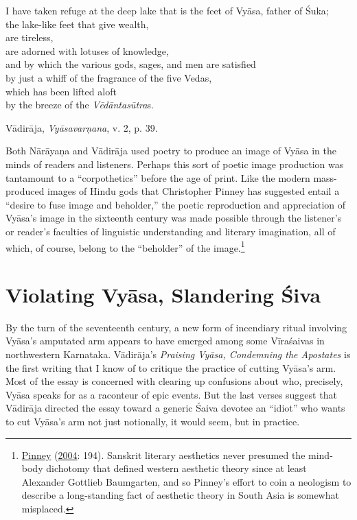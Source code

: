 \begin{pullquote}

            I have taken refuge at the deep lake that is the feet of Vyāsa, father of Śuka;\\
            the lake-like feet that give wealth,\\
            are tireless,\\
            are adorned with lotuses of knowledge,\\
            and by which the various gods, sages, and men are satisfied\\
            by just a whiff of the fragrance of the five Vedas,\\
            which has been lifted aloft\\
            by the breeze of the \emph{Vēdāntasūtra}s.
	  

\medskip\hfill\begin{minipage}{0.9\textwidth}\small\hfill
Vādirāja, \emph{{Vyāsavarṇana}}, v. 2, p. 39.\end{minipage}\hspace{2em}
\end{pullquote}

Both Nārāyaṇa and Vādirāja used poetry to produce an image of Vyāsa in the minds of readers and listeners. Perhaps this sort of poetic image production was tantamount to a “corpothetics” before the age of print. Like the modern mass-produced images of Hindu gods that Christopher Pinney has suggested entail a “desire to fuse image and beholder,” the poetic reproduction and appreciation of Vyāsa’s image in the sixteenth century was made possible through the listener’s or reader’s faculties of linguistic understanding and literary imagination, all of which, of course, belong to the “beholder” of the image.\footnote{%
\hyperref[Pinney2004]{Pinney} (\hyperref[Pinney2004]{2004}: 194). Sanskrit literary aesthetics never presumed the mind-body dichotomy that defined western aesthetic theory since at least Alexander Gottlieb Baumgarten, and so Pinney’s effort to coin a neologism to describe a long-standing fact of aesthetic theory in South Asia is somewhat misplaced.
}


\section{Violating Vyāsa, Slandering Śiva}
      By the turn of the seventeenth century, a new form of incendiary ritual involving Vyāsa’s amputated arm appears to have emerged among some Vīraśaivas in northwestern Karnataka. Vādirāja’s \emph{Praising Vyāsa, Condemning the Apostates} is the first writing that I know of to critique the practice of cutting Vyāsa’s arm. Most of the essay is concerned with clearing up confusions about who, precisely, Vyāsa speaks for as a raconteur of epic events. But the last verses suggest that Vādirāja directed the essay toward a generic Śaiva devotee  \Dash  an “idiot”  \Dash  who wants to cut Vyāsa’s arm not just notionally, it would seem, but in practice.

